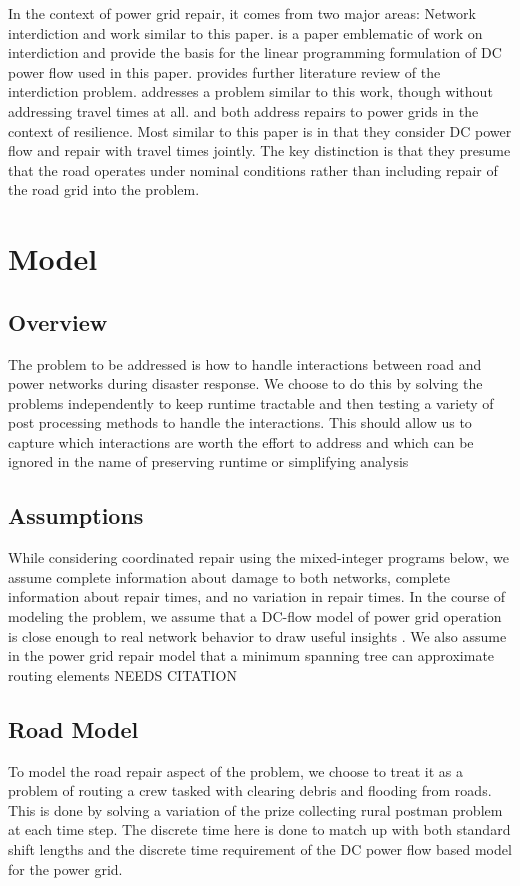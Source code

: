 \documentclass[10pt]{article}
\newcounter{step}
\begin{document}
In the context of power grid repair, it comes from two major areas: Network interdiction and work similar to this paper. \cite{SalmeronEA2010} is a paper emblematic of work on interdiction and provide the basis for the linear programming formulation of DC power flow used in this paper. \cite{Wood2011} provides further literature review of the interdiction problem. \cite{NPSMasters} addresses a problem similar to this work, though without addressing travel times at all. \cite{ArabEA2015} and \cite{MousavizadehEA2018} both address repairs to power grids in the context of resilience. Most similar to this paper is \cite{BentEA2011} in that they consider DC power flow and repair with travel times jointly. The key distinction is that they presume that the road operates under nominal conditions rather than including repair of the road grid into the problem.

\section{\large{Model}}
\vspace*{-12pt}
\subsection{Overview}
The problem to be addressed is how to handle interactions between road and power networks during disaster response. We choose to do this by solving the problems independently to keep runtime tractable and then testing a variety of post processing methods to handle the interactions. This should allow us to capture which interactions are worth the effort to address and which can be ignored in the name of preserving runtime or simplifying analysis
\subsection{Assumptions}
\vspace*{-12pt}
While considering coordinated repair using the mixed-integer programs below, we assume complete information about damage to both networks, complete information about repair times, and no variation in repair times. In the course of modeling the problem, we assume that a DC-flow model of power grid operation is close enough to real network behavior to draw useful insights \cite{QiEA2012}. We also assume in the power grid repair model that a minimum spanning tree can approximate routing elements NEEDS CITATION 
\subsection{Road Model}
\vspace*{-12pt}
To model the road repair aspect of the problem, we choose to treat it as a problem of routing a crew tasked with clearing debris and flooding from roads. This is done by solving a variation of the prize collecting rural postman problem at each time step. The discrete time here is done to match up with both standard shift lengths and the discrete time requirement of the DC power flow based model for the power grid.
\end{document}
